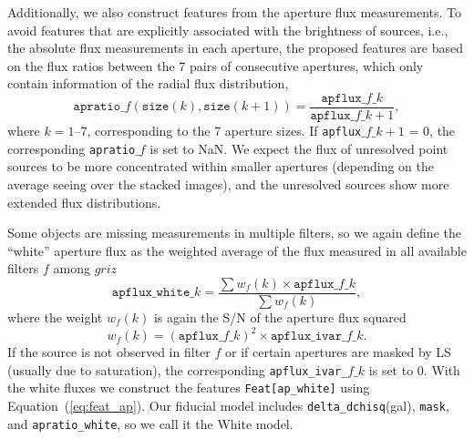 \documentclass[twocolumn,tighten]{aastex631}
\begin{document}
\begin{CJK*}{UTF8}{gbsn}
Additionally, we also construct features from the aperture flux measurements. To avoid features that are explicitly associated with the brightness of sources, i.e., the absolute flux measurements in each aperture, the proposed features are based on the flux ratios between the 7 pairs of consecutive apertures, which only contain information of the radial flux distribution,
\begin{equation}\label{eq:feat_ap}
    \texttt{apratio\_}f(\texttt{size}(k), \texttt{size}(k+1)) = \frac{\texttt{apflux\_}f\texttt{\_}k}{\texttt{apflux\_}f\texttt{\_}k+1},
\end{equation}
where $k=1$--7, corresponding to the 7 aperture sizes. 
If \texttt{apflux}$\_f\_k+1$ = 0, the corresponding \texttt{apratio}$\_f$ is set to NaN. We expect the flux of unresolved point sources to be more concentrated within smaller apertures (depending on the average seeing over the stacked images), and the unresolved sources show more extended flux distributions.

Some objects are missing measurements in multiple filters, so we again define the ``white'' aperture flux as the weighted average of the flux measured in all available filters $f$ among $griz$
\begin{equation}\label{eq:apflux_white}
    \texttt{apflux\_white\_}k = \frac{\sum w_f(k) \times \texttt{apflux\_}f\_k}{\sum w_f(k)},
\end{equation}
where the weight $w_f(k)$ is again the S/N of the aperture flux squared 
\begin{equation*}
    w_f(k) = (\texttt{apflux\_}f\_k)^2\times \texttt{apflux\_ivar\_}f\_k.
\end{equation*} 
If the source is not observed in filter $f$ or if certain apertures are masked by LS (usually due to saturation), the corresponding \texttt{apflux\_ivar\_}$f\_k$ is set to 0. With the white fluxes we construct the features \texttt{Feat[ap\_white]} using Equation~(\ref{eq:feat_ap}).
Our fiducial model includes \texttt{delta\_dchisq}(gal), \texttt{mask}, and \texttt{apratio\_white}, so we call it the White model. 


\end{CJK*}
\end{document}
